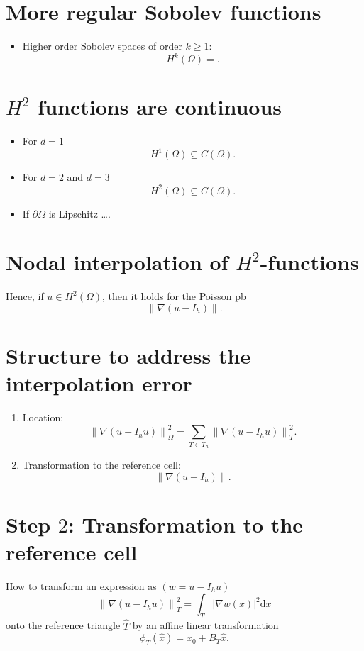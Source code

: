\documentclass[
	a4paper,
	11pt,
	oneside
]{scrreprt}
\theoremstyle{definition}
\begin{document}
\section{More regular Sobolev functions}

\begin{itemize}
	\item Higher order Sobolev spaces of order $k\ge 1$: \[ H^{k}(\Omega)=. \]
\end{itemize}

\section{$H^{2}$ functions are continuous}

\begin{itemize}
	\item For $d=1$ \[ H^{1}(\Omega)\subseteq C(\Omega). \]
	\item For $d=2$ and $d=3$ \[ H^2(\Omega)\subseteq C(\Omega). \]
	\item If $\partial\Omega$ is Lipschitz \ldots.
\end{itemize}

\section{Nodal interpolation of $H^{2}$-functions}

Hence, if $u\in H^{2}(\Omega)$, then it holds for the Poisson pb \[ \|\nabla (u-I_{h})\|. \]

\section{Structure to address the interpolation error}

\begin{enumerate}
	\item Location: \[ {\|\nabla(u-I_{h}u)\|}^{2}_{\Omega}=\sum_{T\in T_{h}}{\|\nabla(u-I_{h}u)\|}^{2}_{T}. \]
	\item Transformation to the reference cell: \[ \|\nabla\left(u-I_{h}\right)\|. \]
\end{enumerate}

\section{Step $2$: Transformation to the reference cell}

How to transform an expression as $\left(w=u-I_{h}u\right)$ \[ {\|\nabla\left(u-I_{h}u\right)\|}^{2}_{T}=\int_{T}{\left|\nabla w(x)\right|}^{2}\mathrm{d}x \] onto the reference triangle $\hat{T}$ by an affine linear transformation \[ \phi_{T}\left(\hat{x}\right)=x_{0}+B_{T}\hat{x}. \]
\end{document}
